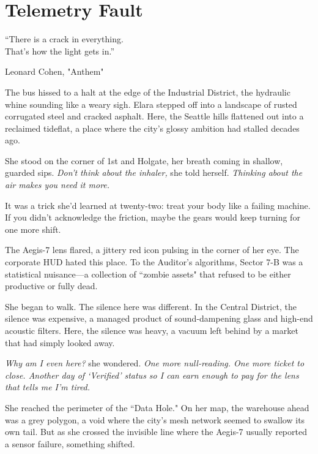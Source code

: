 
\chapter{Telemetry Fault}
\epigraph{``There is a crack in everything.\\ That's how the light gets in.''}{Leonard Cohen, "Anthem"}

The bus hissed to a halt at the edge of the Industrial District, the hydraulic whine sounding like a weary sigh. Elara stepped off into a landscape of rusted corrugated steel and cracked asphalt. Here, the Seattle hills flattened out into a reclaimed tideflat, a place where the city's glossy ambition had stalled decades ago.

She stood on the corner of 1st and Holgate, her breath coming in shallow, guarded sips. \textit{Don't think about the inhaler,} she told herself. \textit{Thinking about the air makes you need it more.} 

It was a trick she’d learned at twenty-two: treat your body like a failing machine. If you didn't acknowledge the friction, maybe the gears would keep turning for one more shift.


The Aegis-7 lens flared, a jittery red icon pulsing in the corner of her eye. The corporate HUD hated this place. To the Auditor’s algorithms, Sector 7-B was a statistical nuisance—a collection of ``zombie assets" that refused to be either productive or fully dead. 

She began to walk. The silence here was different. In the Central District, the silence was expensive, a managed product of sound-dampening glass and high-end acoustic filters. Here, the silence was heavy, a vacuum left behind by a market that had simply looked away.

\textit{Why am I even here?} she wondered. \textit{One more null-reading. One more ticket to close. Another day of `Verified' status so I can earn enough to pay for the lens that tells me I'm tired.}

She reached the perimeter of the ``Data Hole." On her map, the warehouse ahead was a grey polygon, a void where the city’s mesh network seemed to swallow its own tail. But as she crossed the invisible line where the Aegis-7 usually reported a sensor failure, something shifted. 

